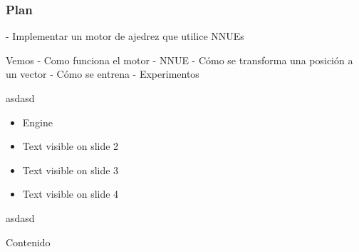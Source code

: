 \begin{frame}
\frametitle{Plan}

- Implementar un motor de ajedrez que utilice NNUEs

Vemos
- Como funciona el motor
- NNUE
- Cómo se transforma una posición a un vector
- Cómo se entrena
- Experimentos

asdasd

\begin{itemize}
\item<1-> Engine
\item<2-> Text visible on slide 2
\item<3> Text visible on slide 3
\item<4-> Text visible on slide 4
\end{itemize}

asdasd

\end{frame}


\begin{frame}{Contenido}
\tableofcontents
\end{frame}
